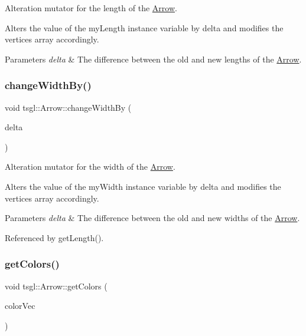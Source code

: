 Alteration mutator for the length of the \hyperlink{classtsgl_1_1_arrow}{Arrow}. 

Alters the value of the my\+Length instance variable by delta and modifies the vertices array accordingly. 
\begin{DoxyParams}{Parameters}
{\em delta} & The difference between the old and new lengths of the \hyperlink{classtsgl_1_1_arrow}{Arrow}. \\
\hline
\end{DoxyParams}
\mbox{\label{classtsgl_1_1_arrow_a5c36193adf4e20487bb596263bb622f2}} 
\subsubsection{\texorpdfstring{change\+Width\+By()}{changeWidthBy()}}
{\footnotesize\ttfamily void tsgl\+::\+Arrow\+::change\+Width\+By (\begin{DoxyParamCaption}\item[{G\+Lfloat}]{delta }\end{DoxyParamCaption})}



Alteration mutator for the width of the \hyperlink{classtsgl_1_1_arrow}{Arrow}. 

Alters the value of the my\+Width instance variable by delta and modifies the vertices array accordingly. 
\begin{DoxyParams}{Parameters}
{\em delta} & The difference between the old and new widths of the \hyperlink{classtsgl_1_1_arrow}{Arrow}. \\
\hline
\end{DoxyParams}


Referenced by get\+Length().

\mbox{\label{classtsgl_1_1_arrow_a45f13b066c85baae9712730787f49fac}} 
\subsubsection{\texorpdfstring{get\+Colors()}{getColors()}}
{\footnotesize\ttfamily void tsgl\+::\+Arrow\+::get\+Colors (\begin{DoxyParamCaption}\item[{std\+::vector$<$ \hyperlink{structtsgl_1_1_color_float}{Color\+Float} $>$ \&}]{color\+Vec }\end{DoxyParamCaption})\hspace{0.3cm}{\ttfamily [virtual]}}



